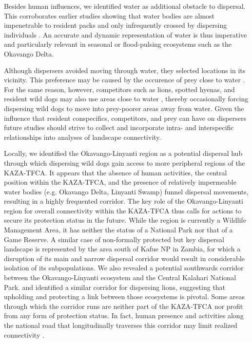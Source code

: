 \documentclass[abstract=on,10pt,a4paper,bibliography=totocnumbered]{article}
\begin{document}
Besides human influences, we identified water as additional obstacle to
dispersal. This corroborates earlier studies showing that water bodies are
almost impenetrable to resident packs \citep{Abrahms.2017} and only infrequently
crossed by dispersing individuals \citep{Cozzi.2020}. An accurate and dynamic
representation of water is thus imperative and particularly relevant in seasonal
or flood-pulsing ecosystems such as the Okavango Delta.

Although dispersers avoided moving through water, they selected locations in its
vicinity. This preference may be caused by the occurence of prey close to water
\citep{Bonyongo.2005}. For the same reason, however, competitors such as lions,
spotted hyenas, and resident wild dogs may also use areas close to water
\citep{Valeix.2010}, thereby occasionally forcing dispersing wild dogs to move
into prey-poorer areas away from water. Given the influence that resident
conspecifics, competitors, and prey can have on dispersers \citep{Cozzi.2018,
Armansin.2019} future studies should strive to collect and incorporate intra-
and interspecific relationships into analyses of landscape connectivity.

Locally, we identified the Okavango-Linyanti region as a potential dispersal hub
through which dispersing wild dogs gain access to more peripheral regions of the
KAZA-TFCA. It appears that the absence of human activities, the central position
within the KAZA-TFCA, and the presence of relatively impermeable water bodies
(e.g. Okavango Delta, Linyanti Swamp) funnel dispersal movements, resulting in a
highly frequented corridor. The key role of the Okavango-Linyanti region for
overall connectivity within the KAZA-TFCA thus calls for actions to secure its
protection status in the future. While the region is currently a Wildlife
Management Area, it has neither the status of a National Park nor that of a Game
Reserve. A similar case of non-formally protected but key dispersal landscape is
represented by the area south of Kafue NP in Zambia, for which a disruption of
its main and narrow dispersal corridor would result in considerable isolation of
its subpopulations. We also revealed a potential southwards corridor between the
Okavango-Linyanti ecosystem and the Central Kalahari National Park.
\cite{Elliot.2014} and \cite{Cushman.2018} identified a similar corridor for
dispersing lions, suggesting that upholding and protecting a link between those
ecosystems is pivotal. Some areas through which the corridor runs are neither
part of the KAZA-TFCA nor profit from any form of protection status. In fact,
human presence and activities along the national road that longitudinally
traverses this corridor may limit realized connectivity \citep{Cozzi.2020}.
\end{document}

